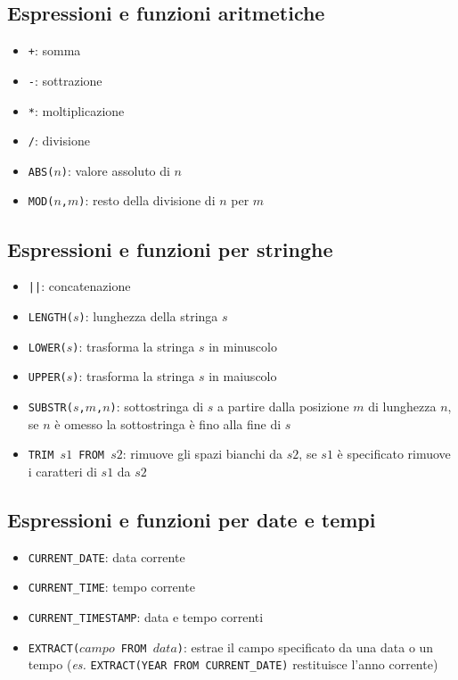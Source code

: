 \documentclass[12pt, a4paper]{report}
\begin{document}
    \subsection{Espressioni e funzioni aritmetiche}
    \begin{itemize}
        \item \texttt{+}: somma
        \item \texttt{-}: sottrazione
        \item \texttt{*}: moltiplicazione
        \item \texttt{/}: divisione
        \item \texttt{ABS($n$)}: valore assoluto di $n$
        \item \texttt{MOD($n$,$m$)}: resto della divisione di $n$ per $m$
    \end{itemize}
    \subsection{Espressioni e funzioni per stringhe}
    \begin{itemize}
        \item \texttt{||}: concatenazione
        \item \texttt{LENGTH($s$)}: lunghezza della stringa $s$
        \item \texttt{LOWER($s$)}: trasforma la stringa $s$ in minuscolo
        \item \texttt{UPPER($s$)}: trasforma la stringa $s$ in maiuscolo
        \item \texttt{SUBSTR($s$,$m$,$n$)}: sottostringa di $s$ a partire dalla posizione $m$ di lunghezza $n$, se $n$ è omesso la sottostringa è fino alla fine di $s$
        \item \texttt{TRIM $s1$ FROM $s2$}: rimuove gli spazi bianchi da $s2$, se $s1$ è specificato rimuove i caratteri di $s1$ da $s2$
    \end{itemize}
    \subsection{Espressioni e funzioni per date e tempi}
    \begin{itemize}
        \item \texttt{CURRENT\_DATE}: data corrente
        \item \texttt{CURRENT\_TIME}: tempo corrente
        \item \texttt{CURRENT\_TIMESTAMP}: data e tempo correnti
        \item \texttt{EXTRACT($campo$ FROM $data$)}: estrae il campo specificato da una data o un tempo (\textit{es.} \texttt{EXTRACT(YEAR FROM CURRENT\_DATE)} restituisce l'anno corrente)
    \end{itemize}
\end{document}

